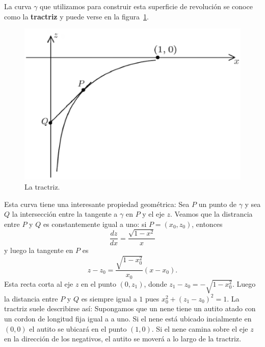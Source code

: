 La curva $\gamma$ que utilizamos para construir esta superficie de revolución
se conoce como la \textbf{tractriz} y puede verse en la
figura~\ref{fig:tractriz}.  

\begin{figure}
		\centering
    	\includegraphics[scale=0.30]{eps/tractriz}
		\caption{La tractriz.}
		\label{fig:tractriz}
\end{figure}

Esta curva tiene una interesante propiedad
geométrica: Sea $P$ un punto de $\gamma$ y sea $Q$ la intersección entre la
tangente a $\gamma$ en $P$ y el eje $z$. Veamos que la distrancia entre $P$ y
$Q$ es constantemente igual a uno: si $P=(x_0,z_0)$, entonces
\[
	\frac{dz}{dx}=\frac{\sqrt{1-x^2}}{x}
\]
y luego la tangente en $P$ es
\[
	z-z_0=\frac{\sqrt{1-x_0^2}}{x_0}(x-x_0).
\]
Esta recta corta al eje $z$ en el punto $(0,z_1)$, donde
$z_1-z_0=-\sqrt{1-x_0^2}$. Luego la distancia entre $P$ y $Q$ es siempre igual
a $1$ pues $x_0^2+(z_1-z_0)^2=1$. La tractriz suele describirse así: Supongamos
que un nene tiene un autito atado con un cordon de longitud fija igual a a uno.
Si el nene está ubicado incialmente en $(0,0)$ el autito se ubicará en el punto
$(1,0)$. Si el nene camina sobre el eje $z$ en la dirección de los negativos,
el autito se moverá a lo largo de la tractriz. 

